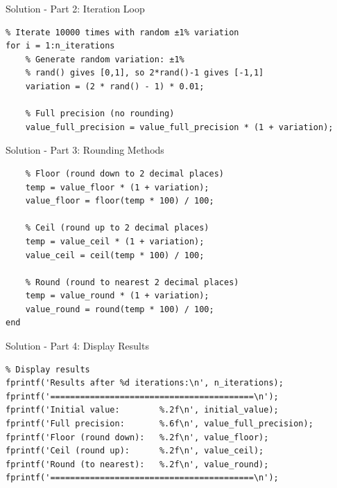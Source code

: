 \documentclass[aspectratio=169]{beamer}
\begin{document}
\begin{frame}[fragile]{Solution - Part 2: Iteration Loop}
    \begin{verbatim}
% Iterate 10000 times with random ±1% variation
for i = 1:n_iterations
    % Generate random variation: ±1%
    % rand() gives [0,1], so 2*rand()-1 gives [-1,1]
    variation = (2 * rand() - 1) * 0.01;
    
    % Full precision (no rounding)
    value_full_precision = value_full_precision * (1 + variation);
    \end{verbatim}
\end{frame}

\begin{frame}[fragile]{Solution - Part 3: Rounding Methods}
    \begin{verbatim}
    % Floor (round down to 2 decimal places)
    temp = value_floor * (1 + variation);
    value_floor = floor(temp * 100) / 100;
    
    % Ceil (round up to 2 decimal places)
    temp = value_ceil * (1 + variation);
    value_ceil = ceil(temp * 100) / 100;
    
    % Round (round to nearest 2 decimal places)
    temp = value_round * (1 + variation);
    value_round = round(temp * 100) / 100;
end
    \end{verbatim}
\end{frame}

\begin{frame}[fragile]{Solution - Part 4: Display Results}
    \begin{verbatim}
% Display results
fprintf('Results after %d iterations:\n', n_iterations);
fprintf('=========================================\n');
fprintf('Initial value:        %.2f\n', initial_value);
fprintf('Full precision:       %.6f\n', value_full_precision);
fprintf('Floor (round down):   %.2f\n', value_floor);
fprintf('Ceil (round up):      %.2f\n', value_ceil);
fprintf('Round (to nearest):   %.2f\n', value_round);
fprintf('=========================================\n');
    \end{verbatim}
\end{frame}
\end{document}
